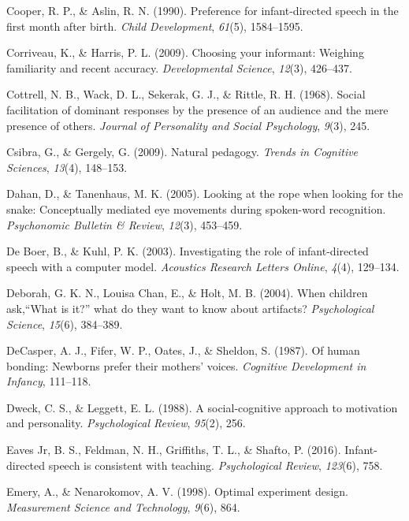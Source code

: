 \documentclass[oneside]{report}
\begin{document}
\hypertarget{ref-cooper1990preference}{}
Cooper, R. P., \& Aslin, R. N. (1990). Preference for infant-directed
speech in the first month after birth. \emph{Child Development},
\emph{61}(5), 1584--1595.

\hypertarget{ref-corriveau2009choosing}{}
Corriveau, K., \& Harris, P. L. (2009). Choosing your informant:
Weighing familiarity and recent accuracy. \emph{Developmental Science},
\emph{12}(3), 426--437.

\hypertarget{ref-cottrell1968social}{}
Cottrell, N. B., Wack, D. L., Sekerak, G. J., \& Rittle, R. H. (1968).
Social facilitation of dominant responses by the presence of an audience
and the mere presence of others. \emph{Journal of Personality and Social
Psychology}, \emph{9}(3), 245.

\hypertarget{ref-csibra2009natural}{}
Csibra, G., \& Gergely, G. (2009). Natural pedagogy. \emph{Trends in
Cognitive Sciences}, \emph{13}(4), 148--153.

\hypertarget{ref-dahan2005looking}{}
Dahan, D., \& Tanenhaus, M. K. (2005). Looking at the rope when looking
for the snake: Conceptually mediated eye movements during spoken-word
recognition. \emph{Psychonomic Bulletin \& Review}, \emph{12}(3),
453--459.

\hypertarget{ref-de2003investigating}{}
De Boer, B., \& Kuhl, P. K. (2003). Investigating the role of
infant-directed speech with a computer model. \emph{Acoustics Research
Letters Online}, \emph{4}(4), 129--134.

\hypertarget{ref-deborah2004children}{}
Deborah, G. K. N., Louisa Chan, E., \& Holt, M. B. (2004). When children
ask,``What is it?'' what do they want to know about artifacts?
\emph{Psychological Science}, \emph{15}(6), 384--389.

\hypertarget{ref-decasper1987human}{}
DeCasper, A. J., Fifer, W. P., Oates, J., \& Sheldon, S. (1987). Of
human bonding: Newborns prefer their mothers' voices. \emph{Cognitive
Development in Infancy}, 111--118.

\hypertarget{ref-dweck1988social}{}
Dweck, C. S., \& Leggett, E. L. (1988). A social-cognitive approach to
motivation and personality. \emph{Psychological Review}, \emph{95}(2),
256.

\hypertarget{ref-eaves2016infant}{}
Eaves Jr, B. S., Feldman, N. H., Griffiths, T. L., \& Shafto, P. (2016).
Infant-directed speech is consistent with teaching. \emph{Psychological
Review}, \emph{123}(6), 758.

\hypertarget{ref-emery1998optimal}{}
Emery, A., \& Nenarokomov, A. V. (1998). Optimal experiment design.
\emph{Measurement Science and Technology}, \emph{9}(6), 864.
\end{document}

